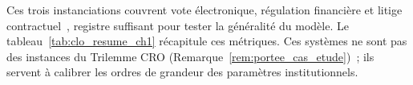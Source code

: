 \begin{sloppypar}
Ces trois instanciations couvrent vote \'electronique, r\'egulation financi\`ere
et litige contractuel~\cite{Nakamoto08,Buterin17}, registre suffisant pour tester la g\'en\'eralit\'e du
mod\`ele. Le tableau~\ref{tab:clo_resume_ch1} r\'ecapitule ces m\'etriques. Ces
syst\`emes ne sont pas des instances du Trilemme CRO
(Remarque~\ref{rem:portee_cas_etude})~; ils servent \`a calibrer les ordres
de grandeur des param\`etres institutionnels.

\end{sloppypar}

